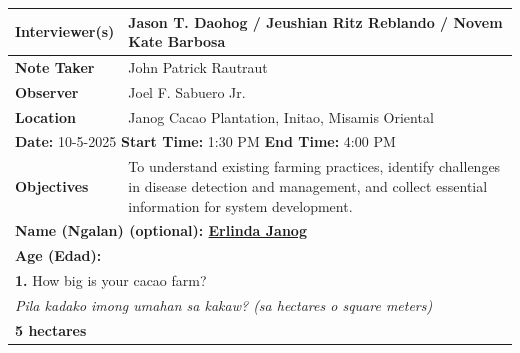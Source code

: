 	\begin{longtable}{|p{4cm}|p{10cm}|}
		\hline
		\textbf{Interviewer(s)} & Jason T. Daohog / Jeushian Ritz Reblando / Novem Kate Barbosa                                                                                                \\ \hline
		\textbf{Note Taker}     & John Patrick Rautraut                                                                                                                                        \\ \hline
		\textbf{Observer}       & Joel F. Sabuero Jr.                                                                                                                                          \\ \hline
		\textbf{Location}       & Janog Cacao Plantation, Initao, Misamis Oriental                                                                                                             \\ \hline
		\multicolumn{2}{|l|}{\textbf{Date:} 10-5-2025 \hspace{1cm} \textbf{Start Time:} 1:30 PM \hspace{1cm} \textbf{End Time:} 4:00 PM}                                                       \\ \hline
		\textbf{Objectives}     & To understand existing farming practices, identify challenges in disease detection and management, and collect essential information for system development. \\ \hline

		\multicolumn{2}{|l|}{\textbf{Name (Ngalan) (optional): \underline{Erlinda Janog}
		}}                                                                                                                                                                                     \\
		\multicolumn{2}{|l|}{\textbf{Age (Edad):}}                                                                                                                                             \\

		\multicolumn{2}{|p{12cm}|}{\vspace{0.1cm} \textbf{1.} How big is your cacao farm?}                                                                                                     \\
		\multicolumn{2}{|p{12cm}|}{\textit{Pila kadako imong umahan sa kakaw? (sa hectares o square meters)}}                                                                                  \\
		\multicolumn{2}{|p{12cm}|}{\textbf{5 hectares}}                                                                                                                                        \\


\end{longtable}
